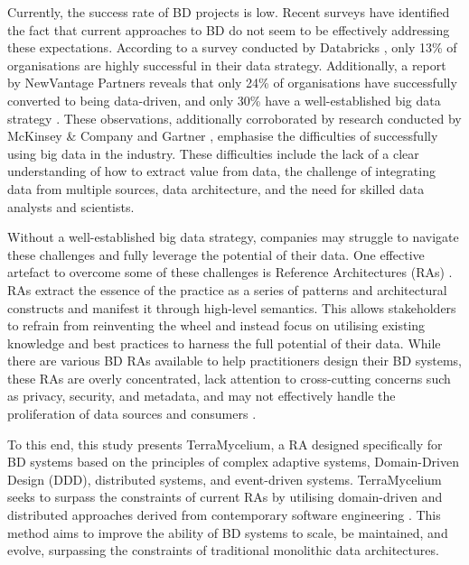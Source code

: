 \documentclass{ieeeaccess}
\begin{document}
Currently, the success rate of BD projects is low. Recent surveys have identified the fact that current approaches to BD do not seem to be effectively addressing these expectations. According to a survey conducted by Databricks \cite{DataBricksSurvey}, only 13\% of organisations are highly successful in their data strategy. Additionally, a report by NewVantage Partners reveals that only 24\% of organisations have successfully converted to being data-driven, and only 30\% have a well-established big data strategy \cite{newvantagepartners2023}. These observations, additionally corroborated by research conducted by McKinsey \& Company \cite{analytics2016age} and Gartner \cite{Nash}, emphasise the difficulties of successfully using big data in the industry. These difficulties include the lack of a clear understanding of how to extract value from data, the challenge of integrating data from multiple sources, data architecture, and the need for skilled data analysts and scientists. 

Without a well-established big data strategy, companies may struggle to navigate these challenges and fully leverage the potential of their data. One effective artefact to overcome some of these challenges is Reference Architectures (RAs) \cite{Cloutier2010}. RAs extract the essence of the practice as a series of patterns and architectural constructs and manifest it through high-level semantics. This allows stakeholders to refrain from reinventing the wheel and instead focus on utilising existing knowledge and best practices to harness the full potential of their data. While there are various BD RAs available to help practitioners design their BD systems, these RAs are overly concentrated, lack attention to cross-cutting concerns such as privacy, security, and metadata, and may not effectively handle the proliferation of data sources and consumers \cite{ataei2022state,AtaeiACIS}.

To this end, this study presents TerraMycelium, a RA designed specifically for BD systems based on the principles of complex adaptive systems, Domain-Driven Design (DDD), distributed systems, and event-driven systems. TerraMycelium seeks to surpass the constraints of current RAs by utilising domain-driven and distributed approaches derived from contemporary software engineering \cite{ataei2023application}. This method aims to improve the ability of BD systems to scale, be maintained, and evolve, surpassing the constraints of traditional monolithic data architectures.
\end{document}
